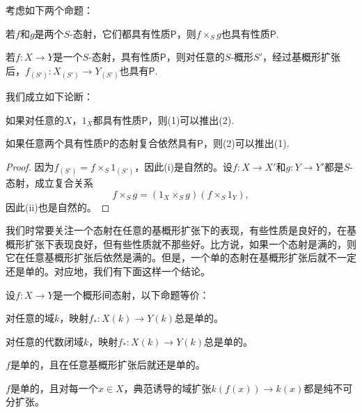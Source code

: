 \begin{pro}\label{pro.2.13}
考虑如下两个命题：
\begin{compactenum}[~~~(1)]
\item 若$f$和$g$是两个$S$-态射，它们都具有性质$\mathsf{P}$，则$f\times_S g$也具有性质$\mathsf{P}$.
\item 若$f:X\to Y$是一个$S$-态射，具有性质$\mathsf{P}$，则对任意的$S$-概形$S'$，经过基概形扩张后，$f_{(S')}:X_{(S')}\to Y_{(S')}$也具有$\mathsf{P}$.
\end{compactenum}
我们成立如下论断：
\begin{compactenum}[~~(i)]
\item 如果对任意的$X$，$1_X$都具有性质$\mathsf{P}$，则(1)可以推出(2).
\item 如果任意两个具有性质$\mathsf{P}$的态射复合依然具有$\mathsf{P}$，则(2)可以推出(1).
\end{compactenum}
\end{pro}

\begin{proof}
因为$f_{(S')}=f\times_S 1_{(S')}$，因此(i)是自然的。设$f:X\to X'$和$g:Y\to Y'$都是$S$-态射，成立复合关系
\[
	f\times_S g=(1_{X}\times_S g)(f\times_S 1_Y),
\]
因此(ii)也是自然的。
\end{proof}

我们时常要关注一个态射在任意的基概形扩张下的表现，有些性质是良好的，在基概形扩张下表现良好，但有些性质就不那些好。比方说，如果一个态射是满的，则它在任意基概形扩张后依然是满的。但是，一个单的态射在基概形扩张后就不一定还是单的。对应地，我们有下面这样一个结论。

\begin{pro}\label{pro.2.14}
设$f:X\to Y$是一个概形间态射，以下命题等价：
\begin{compactenum}[~~~(a)]
\item 对任意的域$k$，映射$f_*:X(k)\to Y(k)$总是单的。
\item 对任意的代数闭域$k$，映射$f_*:X(k)\to Y(k)$总是单的。
\item $f$是单的，且在任意基概形扩张后就还是单的。
\item $f$是单的，且对每一个$x\in X$，典范诱导的域扩张$k(f(x))\to k(x)$都是纯不可分扩张。
\end{compactenum}
\end{pro}

